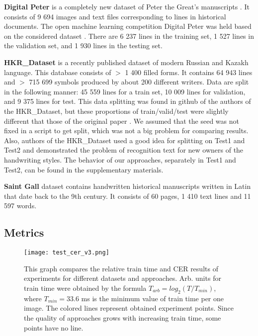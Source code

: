 \documentclass[10pt,twocolumn,letterpaper]{article}
\begin{document}
\medskip
\noindent 
\textbf{Digital Peter} is a completely new dataset of Peter the Great's manuscripts \cite{potanin2021digital}. It consists of 9 694 images and text files corresponding to lines in historical documents. The open machine learning competition Digital Peter was held based on the considered dataset \cite{complink}. There are 6 237 lines in the training set, 1 527 lines in the validation set, and 1 930 lines in the testing set. 

\medskip
\noindent 
\textbf{HKR\_Dataset} \cite{nurseitov2020hkr} is a recently published dataset of modern Russian and Kazakh language. This database consists of $>$ 1 400 filled forms. It contains 64 943 lines and $>$ 715 699 symbols produced by about 200 different writers. Data are split in the following manner: 45 559 lines for a train set, 10 009 lines for validation, and 9 375 lines for test. This data splitting was found in github \cite{hkr_splitting_github} of the authors of the HKR\_Dataset, but these proportions of train/valid/test were slightly different that those of the original paper \cite{nurseitov2020hkr}. We assumed that the seed was not fixed in a script to get split, which was not a big problem for comparing results. Also, authors of the HKR\_Dataset used a good idea for splitting on Test1 and Test2 and demonstrated the problem of recognition text for new owners of the handwriting styles. The behavior of our approaches, separately in Test1 and Test2, can be found in the supplementary  materials.




\medskip
\noindent 
\textbf{Saint Gall} dataset contains handwritten historical manuscripts written in Latin that date back to the 9th century. It consists of 60 pages, 1 410 text lines and 11 597 words.

\subsection{Metrics}

\begin{figure*}
\begin{center}
\texttt{[image: test\_cer\_v3.png]}
\end{center}
   \caption{This graph compares the relative train time and CER results of experiments for different datasets and approaches. Arb. units for train time were obtained by the formula $T_{arb} = log_2(T/T_{min})$, where $T_{min} = 33.6$ ms is the minimum value of train time per one image. The colored lines represent obtained experiment points. Since the quality of approaches grows with increasing train time, some points have no line.}
\label{fig:test_cer}
\end{figure*}
\end{document}

